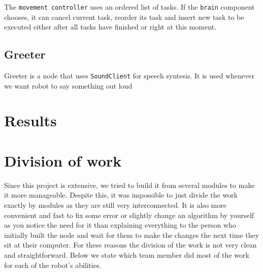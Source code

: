 \documentclass[12pt,a4paper]{article}
\begin{document}
	The \texttt{movement controller} uses an ordered list of tasks. If the \texttt{brain} component chooses, it can cancel current task, reorder its task and insert new task to be executed either after all tasks have finished or right at this moment. \\ 
	
	\subsection{Greeter}
	Greeter is a node that uses \texttt{SoundClient} for speech syntesis. It is used whenever we want robot to say something out loud
	
	\section{Results}
	\section{Division of work}
	Since this project is extensive, we tried to build it from several modules to make it more manageable. Despite this, it was impossible to just divide the work exactly by modules as they are still very interconnected. It is also more convenient and fast to fix some error or slightly change an algorithm by yourself as you notice the need for it than explaining everything to the person who initially built the node and wait for them to make the changes the next time they sit at their computer. For these reasons the division of the work is not very clean and straightforward. Below we state which team member did most of the work for each of the robot's abilities.

	
\end{document}

